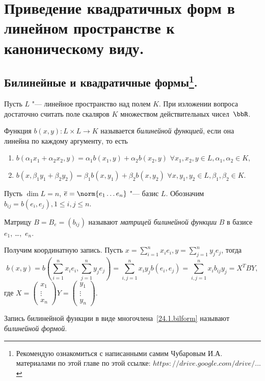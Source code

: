 \chapter{Приведение квадратичных форм в линейном пространстве к каноническому виду.}\label{chapter25}

\section[Билинейные и квадратичные формы.]{Билинейные и квадратичные формы\footnote{Рекомендую ознакомиться с написанными самим Чубаровым И.А. материалами по этой главе по этой ссылке: \href{https://drive.google.com/drive/u/0/folders/0BzuzEyNkpwYDcFhhV1l2N1lhY2s}{$https://drive.google.com/drive/...$}}.}
Пусть $L$ "--- линейное пространство над полем $K$. При изложении вопроса достаточно считать поле скаляров $K$ множеством действительных чисел~$\bbR$.
\begin{defn}  
Функция $b(x,y)\colon L\times L\rightarrow K$ называется \textit{билинейной функцией}, если она линейна по каждому аргументу, то есть
\begin{enumerate}
\item 
$b(\alpha_1 x_1+\alpha_2 x_2,y)=\alpha_1 b(x_1,y)+\alpha_2 b(x_2,y)$ $\forall x_1,x_2,y \in L, \alpha_1,\alpha_2 \in K$,
\item 
$b(x,\beta_1 y_1+\beta_2 y_2)=\beta_1 b(x,y_1)+\beta_2 b(x,y_2)$  $\forall x,y_1,y_2 \in L, \beta_1,\beta_2 \in K$.
\end{enumerate}
\end{defn}

Пусть $\dim L=n$, $\overline{e}=\norm{e_1 \ldots e_n}$ "--- базис $L$. Обозначим $b_{ij}=b(e_i,e_j), 1\le i,j \le n$.
\begin{defn}
Матрицу $B=B_e=(b_{ij})$ называют \textit{матрицей билинейной функции} $B$ в базисе $e_1$, \ldots,~$e_n$.
\end{defn}
  
Получим координатную запись. Пусть $x=\sum\limits_{i=1}^nx_ie_i,y=\sum\limits_{j=1}^ny_je_j$, тогда
\begin{equation}\label{24.1.bilform}
b(x,y)=b(\sum_{i=1}^nx_ie_i,\sum_{j=1}^ny_je_j)=\sum_{i,j=1}^nx_iy_jb(e_i,e_j)=\sum_{i,j=1}^nx_ib_{ij}y_j=X^TBY,
\end{equation}
где $X=\begin{pmatrix}
x_1 \\ \vdots \\ x_n
\end{pmatrix} Y=\begin{pmatrix}
y_1 \\ \vdots \\ y_n
\end{pmatrix}$.
\begin{defn}
Запись билинейной функции в виде многочлена~\eqref{24.1.bilform} называют \textit{билинейной формой}.
\end{defn}

